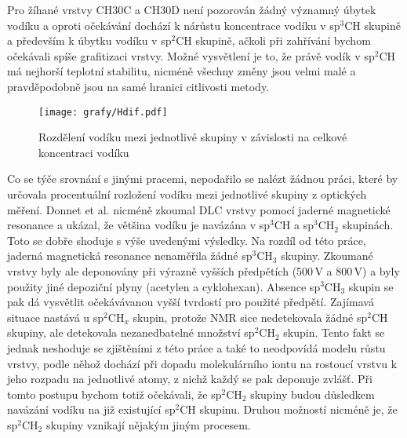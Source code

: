 Pro žíhané vrstvy CH30C a CH30D není pozorován žádný významný úbytek vodíku a oproti očekávání dochází k nárůstu koncentrace vodíku v sp$^3$CH skupině a především k úbytku vodíku v sp$^2$CH skupině, ačkoli při zahřívání bychom očekávali spíše grafitizaci vrstvy. Možné vysvětlení je to, že právě vodík v sp$^2$CH má nejhorší teplotní stabilitu, nicméně všechny změny jsou velmi malé a pravděpodobně jsou na samé hranici citlivosti metody.

\begin{figure}[tbhp]
	\texttt{[image: grafy/Hdif.pdf]}
	\caption{Rozdělení vodíku mezi jednotlivé skupiny v závislosti na celkové koncentraci vodíku}
	\label{Hdif}
\end{figure}

Co se týče srovnání s jinými pracemi, nepodařilo se nalézt žádnou práci, které by určovala procentuální rozložení vodíku mezi jednotlivé skupiny z optických měření. Donnet et al. \cite{Donnet1999} nicméně zkoumal DLC vrstvy pomocí jaderné magnetické resonance a ukázal, že většina vodíku je navázána v sp$^3$CH a sp$^3$CH$_2$ skupinách. 
Toto se dobře shoduje s výše uvedenými výsledky. Na rozdíl od této práce, jaderná magnetická resonance nenaměřila žádné sp$^3$CH$_3$ skupiny. Zkoumané vrstvy byly ale deponovány při výrazně vyšších předpětích (500\,V a 800\,V) a byly použity jiné depoziční plyny (acetylen a cyklohexan). Absence sp$^3$CH$_3$ skupin se pak dá vysvětlit očekávávanou vyšší tvrdostí pro použité předpětí. Zajímavá situace nastává u sp$^2$CH$_x$ skupin, protože NMR sice nedetekovala žádné sp$^2$CH skupiny, ale detekovala nezanedbatelné množství sp$^2$CH$_2$ skupin. 
Tento fakt se jednak neshoduje se zjištěními z této práce a také to neodpovídá modelu růstu vrstvy, podle něhož dochází při dopadu molekulárního iontu na rostoucí vrstvu k jeho rozpadu na jednotlivé atomy, z nichž každý se pak deponuje zvlášť. Při tomto postupu bychom totiž očekávali, že sp$^2$CH$_2$ skupiny budou důsledkem navázání vodíku na již existující sp$^2$CH skupinu. Druhou možností nicméně je, že sp$^2$CH$_2$ skupiny vznikají nějakým jiným procesem.

\cleardoublepage
